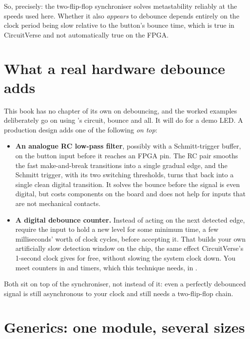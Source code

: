 So, precisely: the two-flip-flop synchroniser solves metastability reliably at the speeds used
here. Whether it also \emph{appears} to debounce depends entirely on the clock period being slow
relative to the button's bounce time, which is true in CircuitVerse and not automatically true on
the FPGA.

\section{What a real hardware debounce adds}
\label{c4:sec:debounce}

This book has no chapter of its own on debouncing, and the worked examples deliberately go on using
's circuit, bounce and all. It will do for a demo LED. A production design
adds one of the following \emph{on top}:
\begin{itemize}
  \item \textbf{An analogue RC low-pass filter}, possibly with a Schmitt-trigger buffer, on the
    button input before it reaches an FPGA pin. The RC pair smooths the fast make-and-break
    transitions into a single gradual edge, and the Schmitt trigger, with its two switching
    thresholds, turns that back into a single clean digital transition. It solves the bounce before
    the signal is even digital, but costs components on the board and does not help for inputs that
    are not mechanical contacts.
  \item \textbf{A digital debounce counter.} Instead of acting on the next detected edge, require
    the input to hold a new level for some minimum time, a few milliseconds' worth of clock cycles,
    before accepting it. That builds your own artificially slow detection window on the chip, the
    same effect CircuitVerse's 1-second clock gives for free, without slowing the system clock down.
    You meet counters in  and timers, which this technique needs, in .
\end{itemize}

Both sit on top of the synchroniser, not instead of it: even a perfectly debounced signal is still
asynchronous to your clock and still needs a two-flip-flop chain.

\section{Generics: one module, several sizes}
\label{c4:sec:generics}

